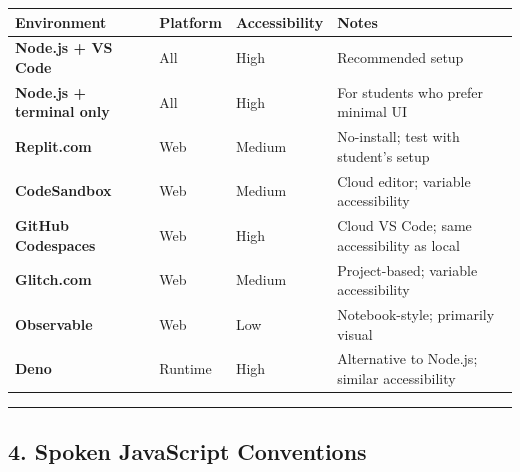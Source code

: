 \documentclass[
  justified,
  openright,
]{tufte-book}
\begin{document}
{\def\LTcaptype{none} %
\begin{longtable}[]{@{}
  >{\raggedright\arraybackslash}p{}
  >{\raggedright\arraybackslash}p{}
  >{\raggedright\arraybackslash}p{}
  >{\raggedright\arraybackslash}p{}@{}}
\toprule\noalign{}
\begin{minipage}[b]{\linewidth}\raggedright
Environment
\end{minipage} & \begin{minipage}[b]{\linewidth}\raggedright
Platform
\end{minipage} & \begin{minipage}[b]{\linewidth}\raggedright
Accessibility
\end{minipage} & \begin{minipage}[b]{\linewidth}\raggedright
Notes
\end{minipage} \\
\midrule\noalign{}
\endhead
\bottomrule\noalign{}
\endlastfoot
\textbf{Node.js + VS Code} & All & High & Recommended setup \\
\textbf{Node.js + terminal only} & All & High & For students who prefer
minimal UI \\
\textbf{Replit.com} & Web & Medium & No-install; test with student's
setup \\
\textbf{CodeSandbox} & Web & Medium & Cloud editor; variable
accessibility \\
\textbf{GitHub Codespaces} & Web & High & Cloud VS Code; same
accessibility as local \\
\textbf{Glitch.com} & Web & Medium & Project-based; variable
accessibility \\
\textbf{Observable} & Web & Low & Notebook-style; primarily visual \\
\textbf{Deno} & Runtime & High & Alternative to Node.js; similar
accessibility \\
\end{longtable}
}

\begin{center}\rule{0.5\linewidth}{0.5pt}\end{center}

\subsection{4. Spoken JavaScript
Conventions}\label{spoken-javascript-conventions}
\end{document}
